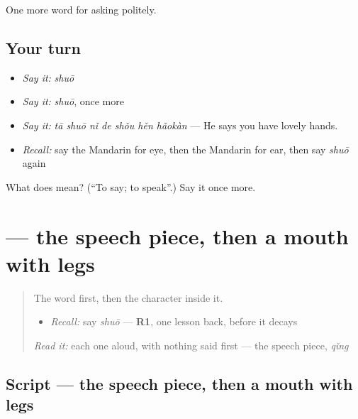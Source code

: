 \begin{grammarlens}[title={What you've built}]
One more word for asking politely.
\end{grammarlens}

\subsection*{Your turn}
\begin{itemize}
\raggedright
  \item \emph{Say it:} \emph{shuō}
  \item \emph{Say it:} \emph{shuō}, once more
  \item \emph{Say it:} \emph{tā shuō nǐ de shǒu hěn hǎokàn} — He says you have lovely hands.
  \item \emph{Recall:} say the Mandarin for eye, then the Mandarin for ear, then say \emph{shuō} again
\end{itemize}

\begin{tcolorbox}[breakable,colback=teal!4,colframe=teal!35!black,title={Before you move on}]
What does  mean? (\textquotedblleft{}To say; to speak\textquotedblright{}.) Say it once more.
\end{tcolorbox}
\section[\texorpdfstring{\zh{说} (shuō)}{说 (shuō)}]{ — the speech piece, then a mouth with legs}

\label{lesson:ZH-W53-shuo}



\begin{quote}
The word first, then the character inside it.

\begin{itemize}
\raggedright
  \item \emph{Recall:} say \emph{shuō} — \textbf{R1}, one lesson back, before it decays
\end{itemize}

\begin{quote}
 
\end{quote}

\emph{Read it:} each one aloud, with nothing said first — the speech piece, \emph{qǐng}
\end{quote}

\subsection*{Script — the speech piece, then a mouth with legs}

